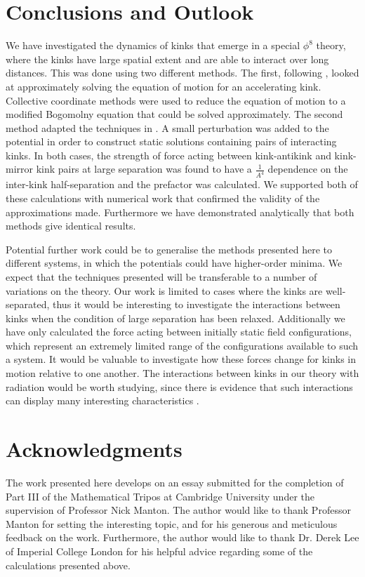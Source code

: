 \documentclass[11pt, oneside]{article}  	%
\numberwithin{equation}{section}
\begin{document}
\section{Conclusions and Outlook}

We have investigated the dynamics of kinks that emerge in a special $\phi^8$ theory, where the kinks have large spatial extent and are able to interact over long distances. This was done using two different methods. The first, following \cite{manton_forces_2019}, looked at approximately solving the equation of motion for an accelerating kink. Collective coordinate methods were used to reduce the equation of motion to a modified Bogomolny equation that could be solved approximately. The second method adapted the techniques in \cite{gonzalez_kinks_1989}. A small perturbation was added to the potential in order to construct static solutions containing pairs of interacting kinks. In both cases, the strength of force acting between kink-antikink and kink-mirror kink pairs at large separation was found to have a $\frac{1}{A^4}$ dependence on the inter-kink half-separation and the prefactor was calculated. We supported both of these calculations with numerical work that confirmed the validity of the approximations made. Furthermore we have demonstrated analytically that both methods give identical results.\par
Potential further work could be to generalise the methods presented here to different systems, in which the potentials could have higher-order minima. We expect that the techniques presented will be transferable to a number of variations on the theory. Our work is limited to cases where the kinks are well-separated, thus it would be interesting to investigate the interactions between kinks when the condition of large separation has been relaxed. Additionally we have only calculated the force acting between initially static field configurations, which represent an extremely limited range of the configurations available to such a system. It would be valuable to investigate how these forces change for kinks in motion relative to one another. The interactions between kinks in our theory with radiation would be worth studying, since there is evidence that such interactions can display many interesting characteristics \cite{forgacs_negative_2008,romanczukiewicz_could_2017}.

\section{Acknowledgments}

The work presented here develops on an essay submitted for the completion of Part III of the Mathematical Tripos at Cambridge University under the supervision of Professor Nick Manton. The author would like to thank Professor Manton for setting the interesting topic, and for his generous and meticulous feedback on the work. Furthermore, the author would like to thank Dr. Derek Lee of Imperial College London for his helpful advice regarding some of the calculations presented above.


\end{document}
